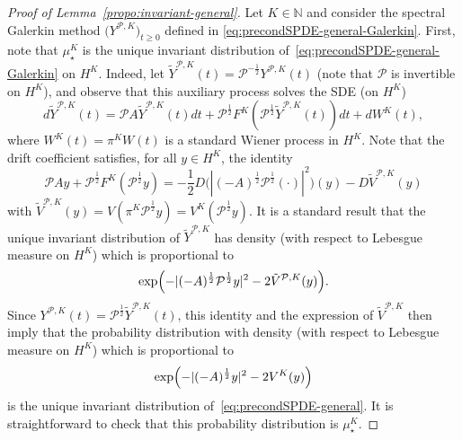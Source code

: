 \documentclass[11pt]{amsart}
\newcommand{\N}{\mathbb{N}}
\begin{document}
\begin{proof}[Proof of Lemma~\ref{propo:invariant-general}]
Let $K\in\N$ and consider the spectral Galerkin method $\bigl(Y^{\mathcal{P},K}\bigr)_{t\ge 0}$ defined in \eqref{eq:precondSPDE-general-Galerkin}.
First, note that $\mu_\star^K$ is the unique invariant distribution of~\eqref{eq:precondSPDE-general-Galerkin} on $H^K$. Indeed, let $\tilde{Y}^{\mathcal{P},K}(t)=\mathcal{P}^{-\frac12}Y^{\mathcal{P},K}(t)$ (note that $\mathcal{P}$ is invertible on $H^K$), and observe that this auxiliary process solves the SDE (on $H^K$)
\[
d\tilde{Y}^{\mathcal{P},K}(t)=\mathcal{P}A\tilde{Y}^{\mathcal{P},K}(t)dt+\mathcal{P}^{\frac12}F^K(\mathcal{P}^{\frac12}\tilde{Y}^{\mathcal{P},K}(t))dt+dW^K(t),
\]
where $W^K(t)=\pi^KW(t)$ is a standard Wiener process in $H^K$. Note that the drift coefficient satisfies, for all $y\in H^K$, the identity
\[
\mathcal{P}Ay+\mathcal{P}^{\frac12}F^K(\mathcal{P}^{\frac12}y)=-\frac{1}{2}D\bigl(|(-A)^{\frac12}\mathcal{P}^{\frac12}(\cdot)|^2\bigr)(y)-D\tilde{V}^{\mathcal{P},K}(y)
\]
with $\tilde{V}^{\mathcal{P},K}(y)=V(\pi^K\mathcal{P}^{\frac12}y)=V^K(\mathcal{P}^{\frac12}y)$. It is a standard result that the unique invariant distribution of $\tilde{Y}^{\mathcal{P},K}$ has density (with respect to Lebesgue measure on $H^K$) which is proportional to
\[
\exp\Bigl(-|(-A)^{\frac12}\mathcal{P}^{\frac12}y|^2-2\tilde{V}^{\mathcal{P},K}(y)\Bigr).
\]
Since $Y^{\mathcal{P},K}(t)=\mathcal{P}^{\frac12}\tilde{Y}^{\mathcal{P},K}(t)$, this identity and the expression of $\tilde{V}^{\mathcal{P},K}$ then imply that the probability distribution with density (with respect to Lebesgue measure on $H^K$) which is proportional to
\[
\exp\Bigl(-|(-A)^{\frac12}y|^2-2V^{K}(y)\Bigr)
\]
is the unique invariant distribution of~\eqref{eq:precondSPDE-general}. It is straightforward to check that this probability distribution is $\mu_\star^K$.


\end{proof}
\end{document}
